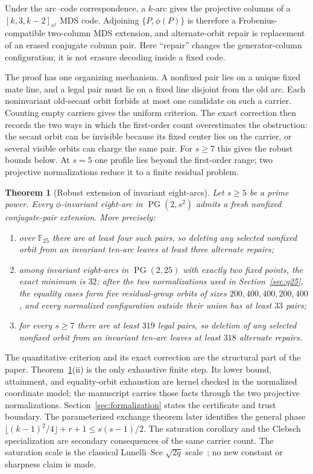 \documentclass[11pt]{article}
\newtheorem{theorem}{Theorem}[section]
\theoremstyle{definition}
\theoremstyle{remark}
\newcommand{\PG}{\operatorname{PG}}
\newcommand{\F}{\mathbb{F}}
\begin{document}
Under the arc--code correspondence, a $k$-arc gives the projective columns
of a $[k,3,k-2]_{s^2}$ MDS code.  Adjoining $\{P,\phi(P)\}$ is therefore a
Frobenius-compatible two-column MDS extension, and alternate-orbit repair is
replacement of an erased conjugate column pair.  Here ``repair'' changes the
generator-column configuration; it is not erasure decoding inside a fixed
code.

The proof has one organizing mechanism.  A nonfixed pair lies on a unique
fixed mate line, and a legal pair must lie on a fixed line disjoint from the
old arc.  Each noninvariant old-secant orbit forbids at most one candidate on
such a carrier.  Counting empty carriers gives the uniform criterion.  The
exact correction then records the two ways in which the first-order count
overestimates the obstruction: the secant orbit can be invisible because
its fixed center lies on the carrier, or several visible orbits can charge
the same pair.  For $s\ge7$ this gives the robust bounds below.  At $s=5$
one profile lies beyond the first-order range; two projective normalizations
reduce it to a finite residual problem.

\begin{theorem}[Robust extension of invariant eight-arcs]
\label{thm:main}
Let $s\ge5$ be a prime power.  Every $\phi$-invariant eight-arc in
$\PG(2,s^2)$ admits a fresh nonfixed conjugate-pair extension.  More
precisely:
\begin{enumerate}[label=(\roman*),leftmargin=2.1em]
\item over $\F_{25}$ there are at least four such pairs, so deleting any
      selected nonfixed orbit from an invariant ten-arc leaves at least
      three alternate repairs;
\item among invariant eight-arcs in $\PG(2,25)$ with exactly two fixed
      points, the exact minimum is $32$; after the two normalizations used in
      Section~\ref{sec:q25}, the equality cases form five residual-group
      orbits of sizes $200,400,400,200,400$, and every normalized
      configuration outside their union has at least $33$ pairs;
\item for every $s\ge7$ there are at least $319$ legal pairs, so deletion of
      any selected nonfixed orbit from an invariant ten-arc leaves at least
      $318$ alternate repairs.
\end{enumerate}
\end{theorem}

The quantitative criterion and its exact correction are the structural
part of the paper.  Theorem~\ref{thm:main}(ii) is the only exhaustive finite
step.  Its lower bound, attainment, and equality-orbit exhaustion are kernel
checked in the normalized coordinate model; the manuscript carries those
facts through the two projective normalizations.  Section~\ref{sec:formalization}
states the certificate and trust boundary.  The parameterized exchange
theorem later identifies the general phase
$\lfloor(k-1)^2/4\rfloor+r+1\le s(s-1)/2$.  The saturation corollary and the
Clebsch specialization are secondary consequences of the same carrier
count.  The saturation scale is the classical Lunelli--Sce $\sqrt{2q}$
scale~\cite{LunelliSce1964,BallLavrauw2019}; no new constant or sharpness
claim is made.
\end{document}
